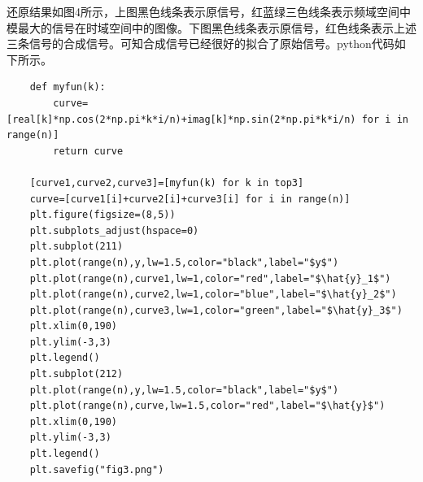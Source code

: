 \documentclass[12pt,a4paper,onecolumn]{article}
\begin{document}
还原结果如图4所示，上图黑色线条表示原信号，红蓝绿三色线条表示频域空间中模最大的信号在时域空间中的图像。下图黑色线条表示原信号，红色线条表示上述三条信号的合成信号。可知合成信号已经很好的拟合了原始信号。python代码如下所示。

\begin{lstlisting}
	def myfun(k):
	    curve=[real[k]*np.cos(2*np.pi*k*i/n)+imag[k]*np.sin(2*np.pi*k*i/n) for i in range(n)]
	    return curve

	[curve1,curve2,curve3]=[myfun(k) for k in top3]
	curve=[curve1[i]+curve2[i]+curve3[i] for i in range(n)]
	plt.figure(figsize=(8,5))
	plt.subplots_adjust(hspace=0)
	plt.subplot(211)
	plt.plot(range(n),y,lw=1.5,color="black",label="$y$")
	plt.plot(range(n),curve1,lw=1,color="red",label="$\hat{y}_1$")
	plt.plot(range(n),curve2,lw=1,color="blue",label="$\hat{y}_2$")
	plt.plot(range(n),curve3,lw=1,color="green",label="$\hat{y}_3$")
	plt.xlim(0,190)
	plt.ylim(-3,3)
	plt.legend()
	plt.subplot(212)
	plt.plot(range(n),y,lw=1.5,color="black",label="$y$")
	plt.plot(range(n),curve,lw=1.5,color="red",label="$\hat{y}$")
	plt.xlim(0,190)
	plt.ylim(-3,3)
	plt.legend()
	plt.savefig("fig3.png")
\end{lstlisting}
\end{document}

